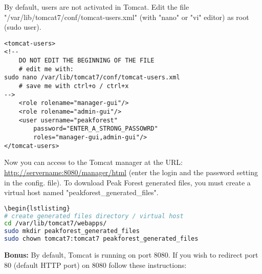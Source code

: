 By default, users are not activated in Tomcat. 
Edit the file "/var/lib/tomcat7/conf/tomcat-users.xml" (\eg with "nano" or "vi" editor) as root (sudo user).

\begin{lstlisting}
<tomcat-users>
<!--
	DO NOT EDIT THE BEGINNING OF THE FILE
	# edit me with:
sudo nano /var/lib/tomcat7/conf/tomcat-users.xml
	# save me with ctrl+o / ctrl+x
-->
	<role rolename="manager-gui"/>
	<role rolename="admin-gui"/>
	<user username="peakforest"
		password="ENTER_A_STRONG_PASSOWRD" 
		roles="manager-gui,admin-gui"/>
</tomcat-users>
\end{lstlisting}

Now you can access to the Tomcat manager at the URL: \url{http://servername:8080/manager/html} (enter the login and the password setting in the config. file). 
To download Peak Forest generated files, you must create a virtual host named "peakforest\_generated\_files". 

\begin{lstlisting}[language=bash,caption={create virtual host},frame=bt]
\begin{lstlisting}
# create generated files directory / virtual host
cd /var/lib/tomcat7/webapps/
sudo mkdir peakforest_generated_files
sudo chown tomcat7:tomcat7 peakforest_generated_files
\end{lstlisting}

%
% 
\textbf{Bonus:} By default, Tomcat is running on port 8080.
If you wish to redirect port 80 (default HTTP port) on 8080 follow these instructions:

